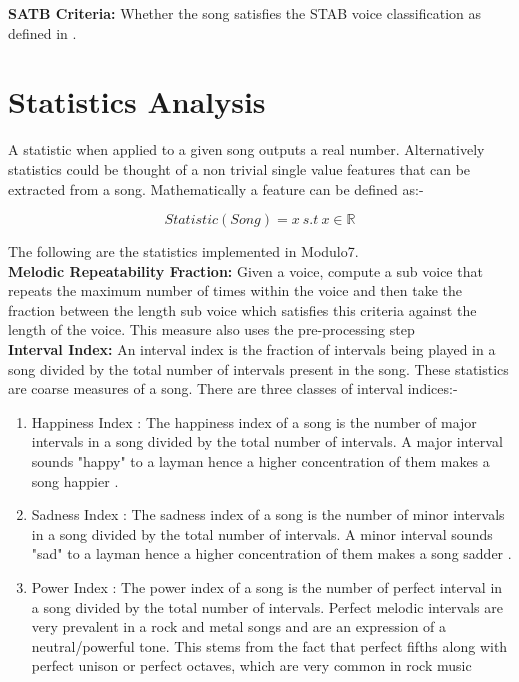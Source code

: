 \noindent \textbf{SATB Criteria:} Whether the song satisfies the STAB voice classification as defined in \cite{satbcriteria}. 

\section{Statistics Analysis} \label{statistic}

\noindent A statistic when applied to a given song outputs a real number. Alternatively statistics could be thought of a non trivial single value features that can be extracted from a song. Mathematically a feature can be defined as:-

\begin{equation}
Statistic(Song) = x \ s.t \ x \in \mathbb{R}
\end{equation}

\noindent The following are the statistics implemented in Modulo7. \\

\noindent \textbf{Melodic Repeatability Fraction: } Given a voice, compute a sub voice that repeats the maximum number of times within the voice and then take the fraction between the length sub voice which satisfies this criteria against the length of the voice. This measure also uses the pre-processing step \\

\noindent \textbf{Interval Index: } \label{intervals} An interval index is the fraction of intervals being played in a song divided by the total number of intervals present in the song. These statistics are coarse measures of a song. There are three classes of interval indices:-

\begin{enumerate}
\item Happiness Index : The happiness index of a song is the number of major intervals in a song divided by the total number of intervals. A major interval sounds "happy" to a layman hence a higher concentration of them makes a song happier \cite{majorvsminorintervals}. 
\item Sadness Index : The sadness index of a song is the number of minor intervals \cite{minorintervalssad}  in a song divided by the total number of intervals. A minor interval sounds "sad" to a layman hence a higher concentration of them makes a song sadder \cite{majorvsminorintervals}. 
\item Power Index : The power index of a song is the number of perfect interval in a song divided by the total number of intervals. Perfect melodic intervals are very prevalent in a rock and metal songs and are an expression of a neutral/powerful tone. This stems from the fact that perfect fifths along with perfect unison or perfect octaves, which are very common in rock music \cite{foundationsOfRock} 
\end{enumerate}

